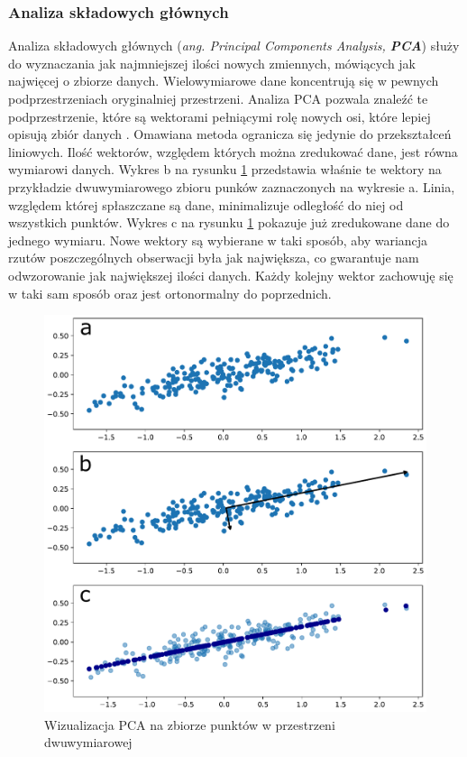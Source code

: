 \documentclass[a4paper,12pt,oneside]{book} %
\begin{document}
\subsubsection{Analiza składowych głównych}
Analiza składowych głównych (\textit{ang. Principal Components Analysis, \textbf{PCA}}) służy do wyznaczania jak najmniejszej ilości nowych zmiennych, mówiących jak najwięcej o zbiorze danych. Wielowymiarowe dane koncentrują się w pewnych podprzestrzeniach oryginalniej przestrzeni. Analiza PCA pozwala znaleźć te podprzestrzenie, które są wektorami pełniącymi rolę nowych osi, które lepiej opisują zbiór danych \cite{redukcjawymiarow}. Omawiana metoda ogranicza się jedynie do przekształceń liniowych. Ilość wektorów, względem których można zredukować dane, jest równa wymiarowi danych. Wykres b na rysunku \ref{fig:pca} przedstawia właśnie te wektory na przykładzie dwuwymiarowego zbioru punków zaznaczonych na wykresie a. Linia, względem której spłaszczane są dane, minimalizuje odległość do niej od wszystkich punktów. Wykres c na rysunku \ref{fig:pca} pokazuje już zredukowane dane do jednego wymiaru. Nowe wektory są wybierane w taki sposób, aby wariancja rzutów poszczególnych obserwacji była jak największa, co gwarantuje nam odwzorowanie jak największej ilości danych. Każdy kolejny wektor zachowuję się w taki sam sposób oraz jest ortonormalny do poprzednich.
\begin{figure}[h!]
	\centering
	\includegraphics[width=15cm]{pca.pdf}
	\caption{Wizualizacja PCA na zbiorze punktów w przestrzeni dwuwymiarowej}
	\label{fig:pca}
\end{figure}
\end{document}
